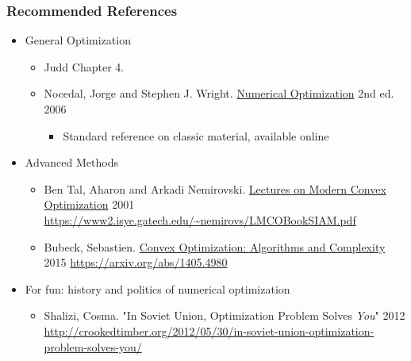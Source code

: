 \documentclass[bigger]{beamer}
\begin{document}
\begin{frame}%
\frametitle{Recommended References}

\begin{itemize}

\item General Optimization 
\begin{itemize}
\item Judd Chapter 4.
\item Nocedal, Jorge and Stephen J. Wright. \underline{Numerical Optimization} 2nd ed. 2006
\begin{itemize}
\item Standard reference on classic material, available online
\end{itemize}
\end{itemize}

\item Advanced Methods
\begin{itemize}
\item Ben Tal, Aharon and Arkadi Nemirovski. \underline{Lectures on Modern Convex  Optimization} 2001 \url{https://www2.isye.gatech.edu/~nemirovs/LMCOBookSIAM.pdf}
\item Bubeck, Sebastien. \underline{Convex  Optimization: Algorithms and Complexity} 2015 \url{https://arxiv.org/abs/1405.4980}
\end{itemize}


\item For fun: history and politics of numerical optimization
\begin{itemize}
\item Shalizi, Cosma. "In Soviet Union, Optimization Problem Solves \emph{You}" 2012 \url{http://crookedtimber.org/2012/05/30/in-soviet-union-optimization-problem-solves-you/}
\end{itemize}






\end{itemize}

\end{frame}%
\end{document}
